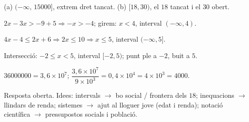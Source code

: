 \begin{solucions}
\begin{sollist}
  \item (a) $(-\infty,\,\num{15000}]$, extrem dret tancat. \quad
        (b) $[18,30)$, el $18$ tancat i el $30$ obert.
  \item $2x-3x>-9+5 \Rightarrow -x>-4$; girem: $x<4$, interval $(-\infty,4)$.
  \item $4x-4\le 2x+6 \Rightarrow 2x\le 10 \Rightarrow x\le 5$, interval $(-\infty,5]$.
  \item Intersecció: $-2\le x<5$, interval $[-2,5)$; punt ple a $-2$, buit a $5$.
  \item $\num{36000000}=3,6\times 10^{7}$; \quad
        $\dfrac{3,6\times 10^{7}}{9\times 10^{3}}=0,4\times 10^{4}=4\times 10^{3}=\num{4000}$.
  \item Resposta oberta. Idees: intervals $\rightarrow$ bo social / frontera dels $18$;
        inequacions $\rightarrow$ llindars de renda; sistemes $\rightarrow$ ajut al
        lloguer jove (edat i renda); notació científica $\rightarrow$ pressupostos
        socials i població.
\end{sollist}
\end{solucions}
